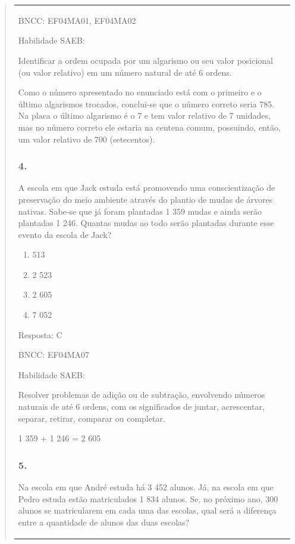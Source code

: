 \begin{enumerate}
\begin{escolha}
\begin{enumerate}
\begin{itemize}
\begin{itemize}
\begin{escolha}
\begin{quote}
\begin{escolha}
{\begin{longtable}[]{@{}l@{}}
\begin{itemize}
BNCC: EF04MA01, EF04MA02

Habilidade SAEB:

Identificar a ordem ocupada por um algarismo ou seu valor posicional (ou
valor relativo) em um número natural de até 6 ordens.

Como o número apresentado no enunciado está com o primeiro e o último
algarismos trocados, conclui-se que o número correto seria 785. Na placa
o último algarismo é o 7 e tem valor relativo de 7 unidades, mas no
número correto ele estaria na centena comum, possuindo, então, um valor
relativo de 700 (setecentos).

\subsubsection{4.}\label{section-146}

A escola em que Jack estuda está promovendo uma conscientização de
preservação do meio ambiente através do plantio de mudas de árvores
nativas. Sabe-se que já foram plantadas 1 359 mudas e ainda serão
plantadas 1 246. Quantas mudas ao todo serão plantadas durante esse
evento da escola de Jack?

\begin{enumerate}
\def\labelenumi{\alph{enumi})}
\item
  513
\item
  2 523
\item
  2 605
\item
  7 052
\end{enumerate}

Resposta: C

BNCC: EF04MA07

Habilidade SAEB:

Resolver problemas de adição ou de subtração, envolvendo números
naturais de até 6 ordens, com os significados de juntar, acrescentar,
separar, retirar, comparar ou completar.

1 359 + 1 246 = 2 605

\subsubsection{5.}\label{section-147}

Na escola em que André estuda há 3 452 alunos. Já, na escola em que
Pedro estuda estão matriculados 1 834 alunos. Se, no próximo ano, 300
alunos se matricularem em cada uma das escolas, qual será a diferença
entre a quantidade de alunos das duas escolas?


\end{itemize}
\end{longtable}}
\end{escolha}
\end{quote}
\end{escolha}
\end{itemize}
\end{itemize}
\end{enumerate}
\end{escolha}
\end{enumerate}
